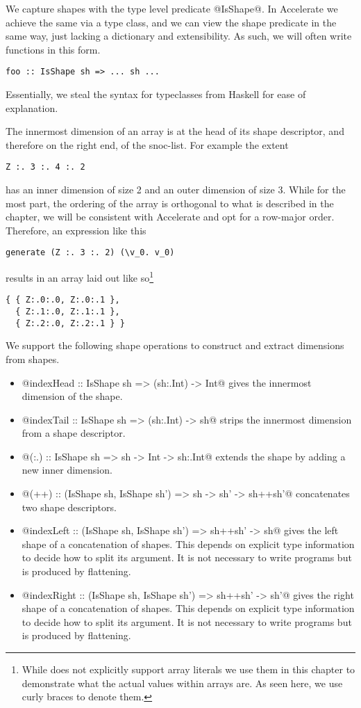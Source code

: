 We capture shapes with the type level predicate @IsShape@. In Accelerate we achieve the same via a type class, and we can view the shape predicate in the same way, just lacking a dictionary and extensibility. As such, we will often write functions in this form.
%
\begin{lstlisting}
foo :: IsShape sh => ... sh ...
\end{lstlisting}
%
Essentially, we steal the syntax for typeclasses from Haskell for ease of explanation.

The innermost dimension of an array is at the head of its shape descriptor, and therefore on the right end, of the snoc-list. For example the extent
%
\begin{lstlisting}
Z :. 3 :. 4 :. 2
\end{lstlisting}
%
has an inner dimension of size 2 and an outer dimension of size 3. While for the most part, the ordering of the array is orthogonal to what is described in the chapter, we will be consistent with Accelerate and opt for a row-major order. Therefore, an expression like this
%
\begin{lstlisting}
generate (Z :. 3 :. 2) (\v_0. v_0)
\end{lstlisting}
%
results in an array laid out like so\footnote{While \ndp{} does not explicitly support array literals we use them in this chapter to demonstrate what the actual values within arrays are. As seen here, we use curly braces to denote them.}
%
\begin{lstlisting}
{ { Z:.0:.0, Z:.0:.1 },
  { Z:.1:.0, Z:.1:.1 },
  { Z:.2:.0, Z:.2:.1 } }
\end{lstlisting}

We support the following shape operations to construct and extract dimensions from shapes.

\begin{itemize}
\item{@indexHead   :: IsShape sh => (sh:.Int) -> Int@ gives the innermost dimension of the shape.}
\item{@indexTail   :: IsShape sh => (sh:.Int) -> sh@ strips the innermost dimension from a shape descriptor.}
\item{@(:.)        :: IsShape sh => sh -> Int -> sh:.Int@ extends the shape by adding a new inner dimension.}
\item{@(++)         :: (IsShape sh, IsShape sh') => sh -> sh' -> sh++sh'@ concatenates two shape descriptors.}
\item{@indexLeft   :: (IsShape sh, IsShape sh') => sh++sh' -> sh@ gives the left shape of a concatenation of shapes. This depends on explicit type information to decide how to split its argument. It is not necessary to write programs but is produced by flattening.}
\item{@indexRight :: (IsShape sh, IsShape sh') => sh++sh' -> sh'@ gives the right shape of a concatenation of shapes. This depends on explicit type information to decide how to split its argument. It is not necessary to write programs but is produced by flattening.}
\end{itemize}

